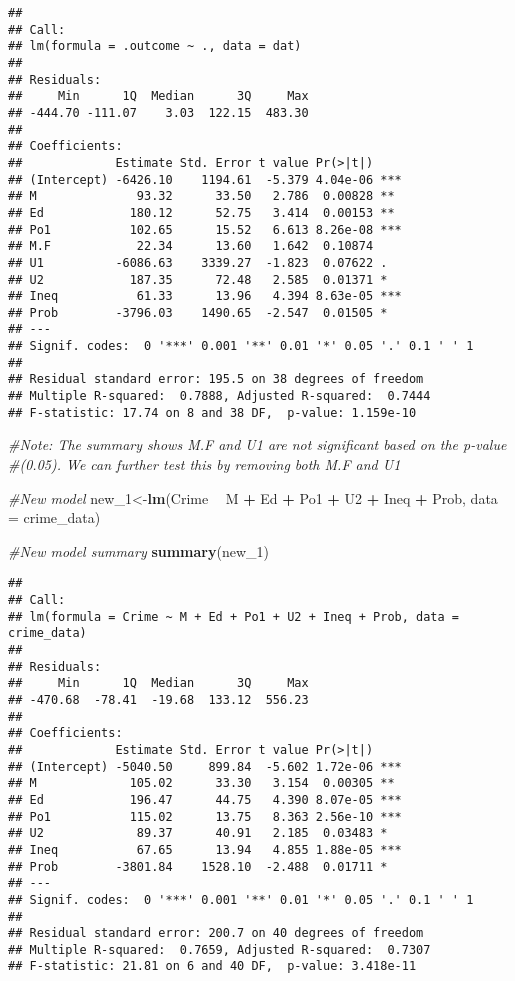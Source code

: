 \documentclass[
]{article}
\newenvironment{Shaded}{\begin{snugshade}}{\end{snugshade}}
\newcommand{\CommentTok}[1]{\textcolor[rgb]{0.56,0.35,0.01}{\textit{#1}}}
\newcommand{\DataTypeTok}[1]{\textcolor[rgb]{0.13,0.29,0.53}{#1}}
\newcommand{\DecValTok}[1]{\textcolor[rgb]{0.00,0.00,0.81}{#1}}
\newcommand{\KeywordTok}[1]{\textcolor[rgb]{0.13,0.29,0.53}{\textbf{#1}}}
\newcommand{\NormalTok}[1]{#1}
\newcommand{\OperatorTok}[1]{\textcolor[rgb]{0.81,0.36,0.00}{\textbf{#1}}}
\newcommand{\StringTok}[1]{\textcolor[rgb]{0.31,0.60,0.02}{#1}}
\begin{document}
\begin{verbatim}
## 
## Call:
## lm(formula = .outcome ~ ., data = dat)
## 
## Residuals:
##     Min      1Q  Median      3Q     Max 
## -444.70 -111.07    3.03  122.15  483.30 
## 
## Coefficients:
##             Estimate Std. Error t value Pr(>|t|)    
## (Intercept) -6426.10    1194.61  -5.379 4.04e-06 ***
## M              93.32      33.50   2.786  0.00828 ** 
## Ed            180.12      52.75   3.414  0.00153 ** 
## Po1           102.65      15.52   6.613 8.26e-08 ***
## M.F            22.34      13.60   1.642  0.10874    
## U1          -6086.63    3339.27  -1.823  0.07622 .  
## U2            187.35      72.48   2.585  0.01371 *  
## Ineq           61.33      13.96   4.394 8.63e-05 ***
## Prob        -3796.03    1490.65  -2.547  0.01505 *  
## ---
## Signif. codes:  0 '***' 0.001 '**' 0.01 '*' 0.05 '.' 0.1 ' ' 1
## 
## Residual standard error: 195.5 on 38 degrees of freedom
## Multiple R-squared:  0.7888, Adjusted R-squared:  0.7444 
## F-statistic: 17.74 on 8 and 38 DF,  p-value: 1.159e-10
\end{verbatim}

\begin{Shaded}
\begin{Highlighting}[]
\CommentTok{#Note: The summary shows M.F and U1 are not significant based on the p-value}
\CommentTok{#(0.05). We can further test this by removing both M.F and U1}

\CommentTok{#New model}
\NormalTok{new_}\DecValTok{1}\NormalTok{<-}\KeywordTok{lm}\NormalTok{(Crime }\OperatorTok{~}\StringTok{ }\NormalTok{M }\OperatorTok{+}\StringTok{ }\NormalTok{Ed }\OperatorTok{+}\StringTok{ }\NormalTok{Po1 }\OperatorTok{+}\StringTok{ }\NormalTok{U2 }\OperatorTok{+}\StringTok{ }\NormalTok{Ineq }\OperatorTok{+}\StringTok{ }\NormalTok{Prob, }\DataTypeTok{data =}\NormalTok{ crime_data)}

\CommentTok{#New model summary}
\KeywordTok{summary}\NormalTok{(new_}\DecValTok{1}\NormalTok{)}
\end{Highlighting}
\end{Shaded}

\begin{verbatim}
## 
## Call:
## lm(formula = Crime ~ M + Ed + Po1 + U2 + Ineq + Prob, data = crime_data)
## 
## Residuals:
##     Min      1Q  Median      3Q     Max 
## -470.68  -78.41  -19.68  133.12  556.23 
## 
## Coefficients:
##             Estimate Std. Error t value Pr(>|t|)    
## (Intercept) -5040.50     899.84  -5.602 1.72e-06 ***
## M             105.02      33.30   3.154  0.00305 ** 
## Ed            196.47      44.75   4.390 8.07e-05 ***
## Po1           115.02      13.75   8.363 2.56e-10 ***
## U2             89.37      40.91   2.185  0.03483 *  
## Ineq           67.65      13.94   4.855 1.88e-05 ***
## Prob        -3801.84    1528.10  -2.488  0.01711 *  
## ---
## Signif. codes:  0 '***' 0.001 '**' 0.01 '*' 0.05 '.' 0.1 ' ' 1
## 
## Residual standard error: 200.7 on 40 degrees of freedom
## Multiple R-squared:  0.7659, Adjusted R-squared:  0.7307 
## F-statistic: 21.81 on 6 and 40 DF,  p-value: 3.418e-11
\end{verbatim}
\end{document}
